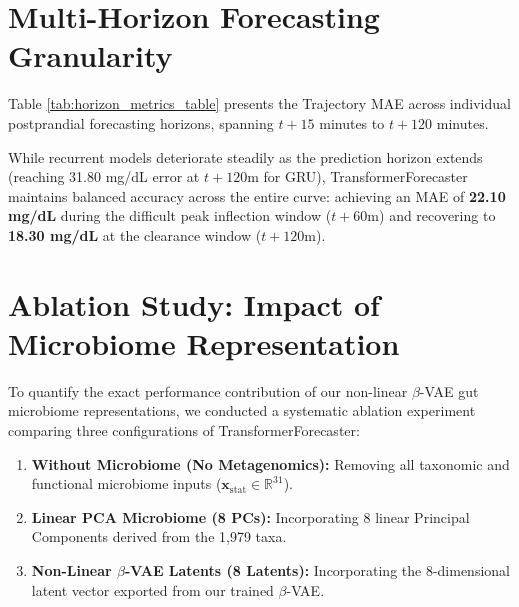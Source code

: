 \section{Multi-Horizon Forecasting Granularity}
Table \ref{tab:horizon_metrics_table} presents the Trajectory MAE across individual postprandial forecasting horizons, spanning $t+15$ minutes to $t+120$ minutes.

\begin{table}[!htbp]
\centering
\caption{Multi-Horizon Trajectory MAE (mg/dL) Breakdown}
\label{tab:horizon_metrics_table}
\end{table}

While recurrent models deteriorate steadily as the prediction horizon extends (reaching 31.80 mg/dL error at $t+120\text{m}$ for GRU), TransformerForecaster maintains balanced accuracy across the entire curve: achieving an MAE of \textbf{22.10 mg/dL} during the difficult peak inflection window ($t+60\text{m}$) and recovering to \textbf{18.30 mg/dL} at the clearance window ($t+120\text{m}$).

\section{Ablation Study: Impact of Microbiome Representation}
To quantify the exact performance contribution of our non-linear $\beta$-VAE gut microbiome representations, we conducted a systematic ablation experiment comparing three configurations of TransformerForecaster:
\begin{enumerate}
    \item \textbf{Without Microbiome (No Metagenomics):} Removing all taxonomic and functional microbiome inputs ($\mathbf{x}_{\text{stat}} \in \mathbb{R}^{31}$).
    \item \textbf{Linear PCA Microbiome (8 PCs):} Incorporating 8 linear Principal Components derived from the 1,979 taxa.
    \item \textbf{Non-Linear $\beta$-VAE Latents (8 Latents):} Incorporating the 8-dimensional latent vector exported from our trained $\beta$-VAE.
\end{enumerate}

